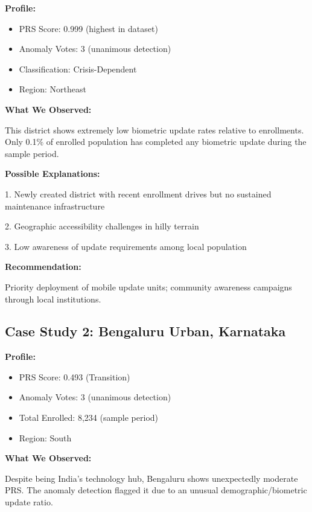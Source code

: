 \documentclass[11pt, a4paper]{article}
\begin{document}
\textbf{Profile:}


\begin{itemize}
\item PRS Score: 0.999 (highest in dataset)

\item Anomaly Votes: 3 (unanimous detection)

\item Classification: Crisis-Dependent

\item Region: Northeast
\end{itemize}

\textbf{What We Observed:}

This district shows extremely low biometric update rates relative to enrollments. Only 0.1\% of enrolled population has completed any biometric update during the sample period.


\textbf{Possible Explanations:}


1. Newly created district with recent enrollment drives but no sustained maintenance infrastructure

2. Geographic accessibility challenges in hilly terrain

3. Low awareness of update requirements among local population


\textbf{Recommendation:}

Priority deployment of mobile update units; community awareness campaigns through local institutions.




\subsection{Case Study 2: Bengaluru Urban, Karnataka}

\textbf{Profile:}


\begin{itemize}
\item PRS Score: 0.493 (Transition)

\item Anomaly Votes: 3 (unanimous detection)

\item Total Enrolled: 8,234 (sample period)

\item Region: South
\end{itemize}

\textbf{What We Observed:}

Despite being India's technology hub, Bengaluru shows unexpectedly moderate PRS. The anomaly detection flagged it due to an unusual demographic/\allowbreak biometric update ratio.
\end{document}
